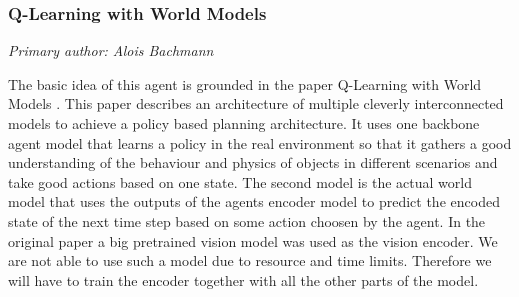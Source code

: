 \documentclass[article, 10pt]{IEEEtran}
\begin{document}




\subsubsection{Q-Learning with World Models}

\textit{Primary author: Alois Bachmann}

The basic idea of this agent is grounded in the paper Q-Learning with World Models \cite{dong2026qwm}. This paper describes an architecture of multiple cleverly interconnected models to achieve a policy based planning architecture. It uses one backbone agent model that learns a policy in the real environment so that it gathers a good understanding of the behaviour and physics of objects in different scenarios and take good actions based on one state. The second model is the actual world model that uses the outputs of the agents encoder model to predict the encoded state of the next time step based on some action choosen by the agent. In the original paper a big pretrained vision model was used as the vision encoder. We are not able to use such a model due to resource and time limits. Therefore we will have to train the encoder together with all the other parts of the model.
\end{document}
